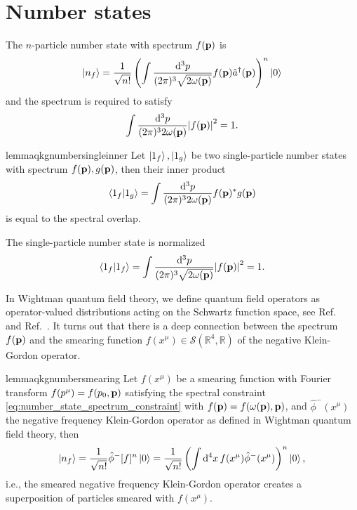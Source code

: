 \section{Number states}

\begin{definition}\label{def:qkg_number_state}
	The $n$-particle number state with spectrum $f(\vb{p})$ is
	\begin{equation}
		\ket{n_f}
		=
		\frac{1}{\sqrt{n!}}
		\left(
			\int\frac{\dd[3]{p}}{(2\pi)^3\sqrt{2\omega(\vb{p})}}
			f(\vb{p})
			\hat{a}^\dagger(\vb{p})
		\right)^n
		\ket{0}
		\label{eq:qkg_number_state}
	\end{equation}
	and the spectrum is required to satisfy
	\begin{equation}
		\int\frac{\dd[3]{p}}{(2\pi)^32\omega(\vb{p})}
		\abs{f(\vb{p})}^2
		=
		1
		\label{eq:number_state_spectrum_constraint}
		.
	\end{equation}
\end{definition}
\begin{restatable}{lemma}{qkgnumbersingleinner}\label{thm:qkg_number_state_inner_single}
	Let $\ket{1_f},\ket{1_g}$ be two single-particle number states with spectrum $f(\vb{p}),g(\vb{p})$, then their inner product
	\begin{equation}
		\braket{1_f}{1_g}
		=
		\int\frac{\dd[3]{p}}{(2\pi)^32\omega(\vb{p})}
		f(\vb{p})^*
		g(\vb{p})
	\end{equation}
	is equal to the spectral overlap.
\end{restatable}
\begin{corollary}
	The single-particle number state is normalized
	\begin{equation}
		\braket{1_f}{1_f}
		=
		\int\frac{\dd[3]{p}}{(2\pi)^3\sqrt{2\omega(\vb{p})}}
		\abs{f(\vb{p})}^2
		=
		1
		.
	\end{equation}
\end{corollary}
In Wightman quantum field theory, we define quantum field operators as operator-valued distributions acting on the Schwartz function space, see Ref.~\cite{Bogolubov1989} and Ref.~\cite{Streater2016}.
It turns out that there is a deep connection between the spectrum $f(\vb{p})$ and the smearing function $f(x^\mu)\in\mathcal{S}(\mathbb{R}^4,\mathbb{R})$ of the negative Klein-Gordon operator.
\begin{restatable}{lemma}{qkgnumbersmearing}\label{thm:qkg_number_state_smearing}
	Let $f(x^\mu)$ be a smearing function with Fourier transform $f(p^\mu)=f(p_0,\vb{p})$ satisfying the spectral constraint \cref{eq:number_state_spectrum_constraint} with $f(\vb{p})=f(\omega(\vb{p}),\vb{p})$, and $\hat\phi^-(x^\mu)$ the negative frequency Klein-Gordon operator as defined in Wightman quantum field theory, then
	\begin{equation}
		\ket{n_f}
		=
		\frac{1}{\sqrt{n!}}
		\hat\phi^-[f]^n
		\ket{0}
		=
		\frac{1}{\sqrt{n!}}
		\left(
			\int\dd[4]{x}
			f(x^\mu)
			\hat\phi^-(x^\mu)
		\right)^n
		\ket{0}
		\label{eq:qkg_number_state_smearing}
		,
	\end{equation}
	i.e., the smeared negative frequency Klein-Gordon operator creates a superposition of particles smeared with $f(x^\mu)$.
\end{restatable}
